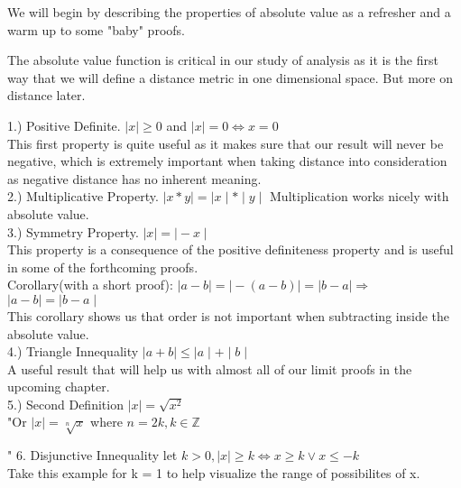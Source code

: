 \documentclass[12pt]{article}
\theoremstyle{definition}
\newenvironment{statement}[2][Section]{\begin{trivlist}
\item[\hskip \labelsep {\bfseries #1}\hskip \labelsep {\bfseries #2.}]}{\end{trivlist}}
\begin{document}
\begin{statement}{Absolute Value and Why it's so useful}


We will begin by describing the properties of absolute value as a refresher and a warm up 
to some "baby" proofs. \vspace{10pt}

The absolute value function is critical in our study of analysis as it is the first way that we will define a distance metric in one dimensional space. But more on distance later.


1.) Positive Definite.
$ \mid x \mid \ge 0$ and $ \mid x \mid= 0 \iff x = 0$\\


This first property is quite useful as it makes sure that our result will never be negative, which is extremely important when taking distance into consideration as negative distance has no inherent meaning.\\



2.) Multiplicative Property.
$\mid x * y \mid = \mid x \mid * \mid y \mid $
Multiplication works nicely with absolute value.\\

3.) Symmetry Property.
$\mid x \mid = \mid -x \mid$ \\
This property is a consequence of the positive definiteness property and is useful in some of the forthcoming proofs.\\

Corollary(with a short proof):
$\mid a - b \mid = \mid - (a - b) \mid = \mid b - a \mid \Rightarrow$\\
$\mid a - b \mid = \mid b - a \mid $\\
This corollary shows us that order is not important when subtracting inside the absolute value.\\

4.) Triangle Innequality
$\mid a + b \mid \le \mid a \mid + \mid b \mid$\\
A useful result that will help us with almost all of our limit proofs in the upcoming chapter.\\


5.) Second Definition
$\mid x \mid = \sqrt{x^2}$  \\

"Or $ \mid x \mid = \sqrt[n]{x} $ where $ n = 2k, k \in \mathbb{Z} $

"
6. Disjunctive Innequality 
let $ k > 0, \mid x \mid \ge k \iff x \ge k \vee x \le -k$\\
Take this example for k = 1 to help visualize the range of possibilites of x.\\


\end{statement}
\end{document}
